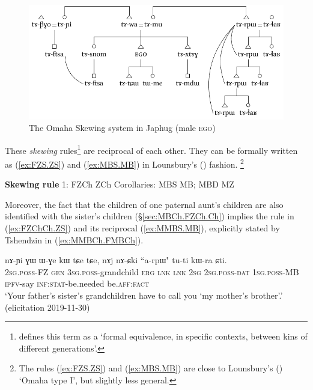 \begin{figure}
\caption{The Omaha Skewing system in Japhug (male \textsc{ego})} \label{fig:omaha}
\includegraphics[width=\textwidth]{kinship-japhug-1.pdf}
\end{figure}
 
These \textit{skewing} rules\footnote{ \citet[357]{lounsbury64crow} defines this term as a `formal equivalence, in specific contexts, between kins of different generations'. } are reciprocal of each other.  They can be formally written as (\ref{ex:FZS.ZS}) and (\ref{ex:MBS.MB}) in Lounsbury's (\citeyear{lounsbury64crow}) fashion. \footnote{The rules (\ref{ex:FZS.ZS}) and (\ref{ex:MBS.MB}) are close to Lounsbury's (\citeyear[359]{lounsbury64crow}) `Omaha type I', but slightly less general. }
 
\begin{exe}
\ex 
\begin{xlist}
\ex \label{ex:FZS.ZS}
\glt \textbf{Skewing rule} 1: FZCh \fl{} ZCh
\ex \label{ex:MBS.MB}
\glt Corollaries:  MBS \fl{} MB; MBD \fl{} MZ
\end{xlist}
\end{exe}

Moreover, the fact that the children of one paternal aunt's children are also identified with the sister's children (§\ref{sec:MBCh.FZCh.Ch}) implies the rule in (\ref{ex:FZChCh.ZS}) and its reciprocal (\ref{ex:MMBS.MB}), explicitly stated by Tshendzin in (\ref{ex:MMBCh.FMBCh}).

\begin{exe}
\ex \label{ex:MMBCh.FMBCh}
\gll nɤ-ɲi ɣɯ ɯ-ɣe kɯ tɕe tɕe, nɤj nɤ-ɕki ``a-rpɯ" tu-ti kɯ-ra ɕti. \\
\textsc{2sg}.\textsc{poss}-FZ \textsc{gen} \textsc{3sg}.\textsc{poss}-grandchild \textsc{erg} \textsc{lnk} \textsc{lnk} \textsc{2sg} \textsc{2sg}.\textsc{poss}-\textsc{dat} \textsc{1sg}.\textsc{poss}-MB \textsc{ipfv}-say \textsc{inf}:\textsc{stat}-be.needed be.\textsc{aff}:\textsc{fact} \\
\glt `Your father's sister's grandchildren have to call you `my mother's brother'.' (elicitation 2019-11-30)
\end{exe}


